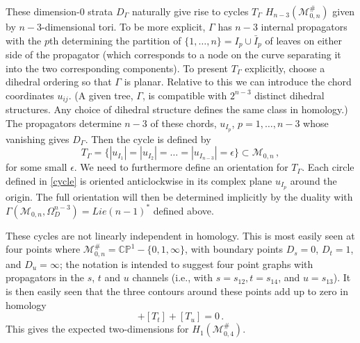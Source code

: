 \documentclass[11pt]{article}
\newcommand{\CP}{\mathbb{CP}}
\newcommand{\cM}{\mathcal{M}}
\newcommand{\1}{{\rm 1\hskip-0.25em I}}
\begin{document}
These dimension-0 strata $D_\Gamma$ naturally give rise to cycles $T_\Gamma$ 
$H_{n-3}(\cM_{0,n}^\#)$ given by $n-3$-dimensional tori. To be more explicit, $\Gamma$  has $n-3$ internal propagators with the $p$th determining the partition of $\{1,\ldots, n\}=I_p\cup \bar I_p$  of leaves on either side of the propagator (which corresponds to a node on the curve separating it into the two corresponding components).  To present $T_\Gamma$ explicitly, choose a dihedral ordering so that $\Gamma$ is planar.  Relative to this we can introduce the chord coordinates $u_{ij}$. (A given tree, $\Gamma$, is compatible with $2^{n-3}$ distinct dihedral structures. Any choice of dihedral structure defines the same class in homology.) The propagators determine  $n-3$ of these chords,  $u_{I_p}$, $p=1,\ldots , n-3$ whose vanishing gives $D_\Gamma$.
Then the cycle  is defined by 
\begin{equation}
T_\Gamma=\{|u_{I_1}|=|u_{I_2}|=\ldots=|u_{I_{n-3}}|=\epsilon\}\subset \cM_{0,n}\, , \label{cycle}
\end{equation}
for some small $\epsilon$.  
We need to furthermore define an orientation for $T_\Gamma$.  Each circle defined in \eqref{cycle} is oriented anticlockwise in its complex plane $u_{I_p}$ around the origin.  The full orientation will then be determined implicitly by the duality with $\Gamma(\cM_{0,n},\Omega^{n-3}_D)=Lie(n-1)^*$ defined above.

These cycles are not linearly independent in homology.  This is most easily seen at four points where $\cM^\#_{0,n}=\CP^1-\{0,1,\infty\}$,
with boundary points  $D_{s}=0$, $D_{t}=1$, and $D_{u}=\infty$; the notation is intended to suggest four point graphs with propagators in the $s$, $t$ and $u$ channels (i.e., with $s=s_{12}, t=s_{14}$, and $u=s_{13}$). It is then easily seen that the three contours around these points add up to zero in homology
\begin{equation}
[T_{s}]+[T_{t}]+[T_u]=0\, .
\end{equation}
This gives the  expected two-dimensions for $H_1(\cM^\#_{0,4})$. 
\end{document}
